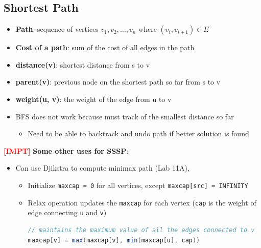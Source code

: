 \documentclass{article}
\newcommand{\impt}[0]{\textcolor{red}{\textbf{[IMPT] }}}
\begin{document}
\begin{multicols}{2}
\subsection{Shortest Path}
\begin{itemize}
	\item \textbf{Path}: sequence of vertices $v_1, v_2, \dots, v_n$ where $(v_i, v_{i+1}) \in E$
	\item \textbf{Cost of a path}: sum of the cost of all edges in the path
	\item \textbf{distance(v)}: shortest distance from s to v
	\item \textbf{parent(v)}: previous node on the shortest path so far from s to v
	\item \textbf{weight(u, v)}: the weight of the edge from u to v
	\item BFS does not work because must track of the smallest distance so far
	\begin{itemize}
		\item Need to be able to backtrack and undo path if better solution is found
	\end{itemize}
\end{itemize}
\impt \textbf{Some other uses for SSSP}:
\begin{itemize}
	\item Can use Djikstra to compute minimax path (Lab 11A),
	\begin{itemize}
		\item Initialize \texttt{maxcap = 0} for all vertices, except \texttt{maxcap[src] = INFINITY}
		\item Relax operation updates the \texttt{maxcap} for each vertex (\texttt{cap} is the weight of edge connecting \texttt{u} and \texttt{v})
		\begin{lstlisting}[language=Java]
// maintains the maximum value of all the edges connected to v
maxcap[v] = max(maxcap[v], min(maxcap[u], cap))
\end{lstlisting}
	\end{itemize}
\end{itemize}

\end{multicols}
\end{document}
